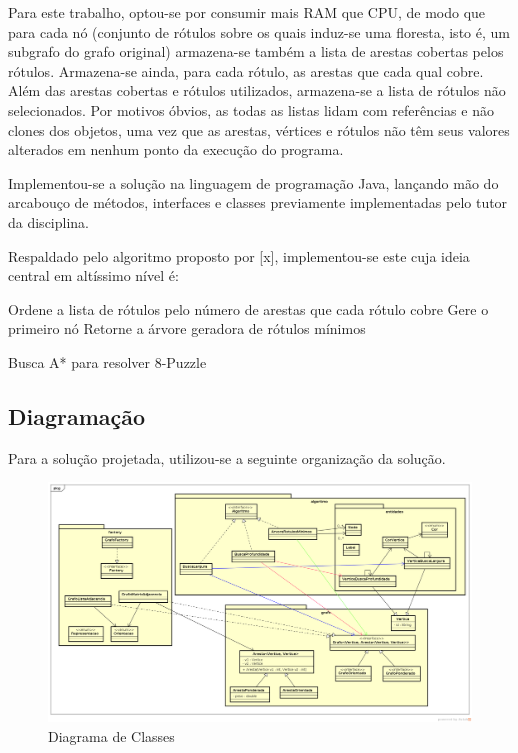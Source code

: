 \documentclass[12pt]{article}
\begin{document}
		Para este trabalho, optou-se por consumir mais RAM que CPU, de modo que para cada nó (conjunto de rótulos sobre os quais induz-se uma floresta, isto é, um subgrafo do grafo original) armazena-se também a lista de arestas cobertas pelos rótulos. Armazena-se ainda, para cada rótulo, as arestas que cada qual cobre. Além das arestas cobertas e rótulos utilizados, armazena-se a lista de rótulos não selecionados. Por motivos óbvios, as todas as listas lidam com referências e não clones dos objetos, uma vez que as arestas, vértices e rótulos não têm seus valores alterados em nenhum ponto da execução do programa.

		Implementou-se a solução na linguagem de programação Java, lançando mão do arcabouço de métodos, interfaces e classes previamente implementadas pelo tutor da disciplina.

		Respaldado pelo algoritmo proposto por [x], implementou-se este cuja ideia central em altíssimo nível é:

		\begin{algorithm}[H]
			\SetAlgoLined
			Ordene a lista de rótulos pelo número de arestas que cada rótulo cobre\;
			Gere o primeiro nó\;
			Retorne a árvore geradora de rótulos mínimos\;
			\caption{Busca A* para resolver 8-Puzzle}
		\end{algorithm}

	\subsection{Diagramação}\label{sec:diagramacao}

		Para a solução projetada, utilizou-se a seguinte organização da solução.

		\begin{landscape}
		\centering
		\begin{figure}[p]
		\includegraphics[width=1.4\textwidth]{ClassDiagram.png}
		\caption{Diagrama de Classes}
		\label{fig:classDiagram}
		\end{figure}
		\end{landscape}
		\restoregeometry
\end{document}
